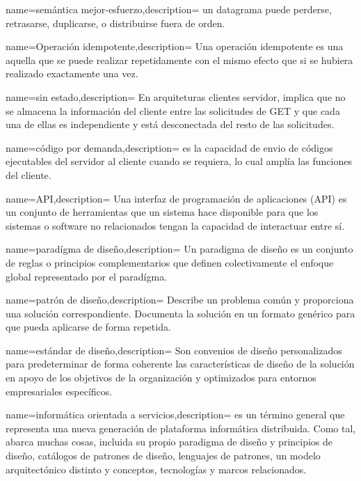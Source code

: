{name={semántica mejor-esfuerzo},description= {un datagrama  puede perderse, retrasarse, duplicarse, o distribuirse fuera de orden. }}

{name={Operación idempotente},description= {Una operación idempotente es una aquella que se puede realizar repetidamente con el mismo efecto que si se hubiera realizado exactamente una vez.}}

{name={sin estado},description= {En arquiteturas clientes servidor,  implica que no se almacena la información del cliente entre las solicitudes de GET y que cada una de ellas es independiente y está desconectada del resto de las solicitudes.}}


{name={código por demanda},description= {es la capacidad de  envio de códigos ejecutables del servidor al cliente cuando se requiera, lo cual amplía las funciones del cliente.}}

{name={API},description= {Una interfaz de programación de aplicaciones (API) es un conjunto de herramientas que un sistema hace disponible para que los sistemas o software no relacionados tengan la capacidad de interactuar entre sí. }}

{name={paradígma de diseño},description= {Un paradigma de diseño es un 	conjunto de reglas o principios complementarios que definen colectivamente el enfoque global representado por el paradígma. }}


{name={patrón de diseño},description= {  Describe un problema común y proporciona una solución correspondiente. Documenta la solución  en un formato genérico para que pueda aplicarse de forma repetida.  }}

{name={estándar de diseño},description= {Son convenios de diseño personalizados para predeterminar de forma coherente las características de diseño de la solución en apoyo de los objetivos de la organización y optimizados para entornos empresariales específicos. }}

{name={informática  orientada a servicios},description= { es un término general que representa una nueva generación  de  plataforma informática distribuida. Como tal, abarca muchas cosas, incluida su propio paradigma de diseño y principios de diseño, catálogos de patrones de diseño, lenguajes de patrones, un 	modelo arquitectónico distinto y conceptos, tecnologías y marcos relacionados.}}


